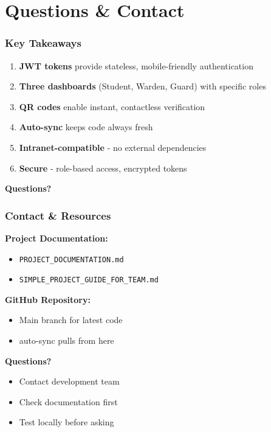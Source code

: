 \documentclass[11pt]{beamer}
\begin{document}
\section{Questions \& Contact}

\begin{frame}
\frametitle{Key Takeaways}
\begin{enumerate}
    \item \textbf{JWT tokens} provide stateless, mobile-friendly authentication
    \item \textbf{Three dashboards} (Student, Warden, Guard) with specific roles
    \item \textbf{QR codes} enable instant, contactless verification
    \item \textbf{Auto-sync} keeps code always fresh
    \item \textbf{Intranet-compatible} - no external dependencies
    \item \textbf{Secure} - role-based access, encrypted tokens
\end{enumerate}

\vspace{1cm}
\begin{center}
\textbf{\Large Questions?}
\end{center}
\end{frame}

\begin{frame}
\frametitle{Contact \& Resources}
\begin{center}
\Large
\textbf{Project Documentation:}
\begin{itemize}
    \item \texttt{PROJECT\_DOCUMENTATION.md}
    \item \texttt{SIMPLE\_PROJECT\_GUIDE\_FOR\_TEAM.md}
\end{itemize}

\vspace{1cm}
\textbf{GitHub Repository:}
\begin{itemize}
    \item Main branch for latest code
    \item auto-sync pulls from here
\end{itemize}

\vspace{1cm}
\textbf{Questions?}
\begin{itemize}
    \item Contact development team
    \item Check documentation first
    \item Test locally before asking
\end{itemize}
\end{center}
\end{frame}
\end{document}
